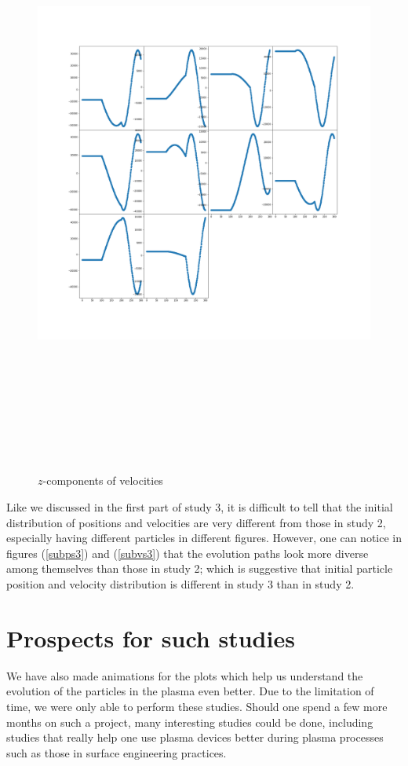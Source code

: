 \documentclass[12pt]{article}
\begin{document}
	\begin{figure}[H]
		\includegraphics[width=\linewidth, height=20cm]{subvsz3.png} \caption{$z$-components of velocities} \label{subvsz3}
	\end{figure}
	\noindent Like we discussed in the first part of study 3, it is difficult to tell that the initial distribution of positions and velocities are very different from those in study 2, especially having different particles in different figures. However, one can notice in figures (\ref{subps3}) and (\ref{subvs3}) that the evolution paths look more diverse among themselves than those in study 2; which is suggestive that initial particle position and velocity distribution is different in study 3 than in study 2.
	\section{Prospects for such studies}
	\noindent We have also made animations for the plots which help us understand the evolution of the particles in the plasma even better. Due to the limitation of time, we were only able to perform these studies. Should one spend a few more months on such a project, many interesting studies could be done, including studies that really help one use plasma devices better during plasma processes such as those in surface engineering practices. 
	
\end{document}
